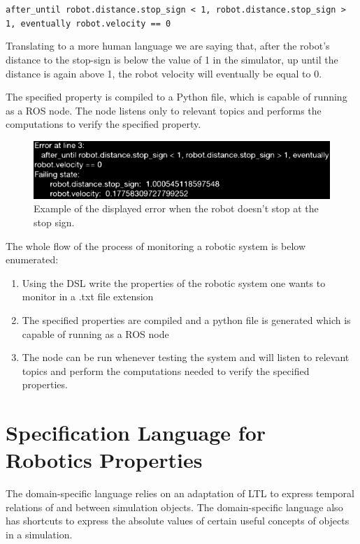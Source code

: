 \documentclass[runningheads]{llncs}
\begin{document}
\vspace{3mm}

\texttt{after\_until robot.distance.stop\_sign < 1, robot.distance.stop\_sign > 1, eventually robot.velocity == 0}

\vspace{3mm}

Translating to a more human language we are saying that, after the robot's distance to the stop-sign is below the value of 1 in the simulator, up until the distance is again above 1, the robot velocity will eventually be equal to 0.

The specified property is compiled to a Python file, which is capable of running as a ROS node. The node listens only to relevant topics and performs the computations to verify the specified property.

\begin{figure}
\includegraphics[width=\textwidth]{error.eps}
\caption{Example of the displayed error when the robot doesn't stop at the stop sign.} \label{fig1}
\end{figure}

The whole flow of the process of monitoring a robotic system is below enumerated:

\begin{enumerate}[label=(\roman*)]
    \item Using the DSL write the properties of the robotic system one wants to monitor in a .txt file extension
    \item The specified properties are compiled and a python file is generated which is capable of running as a ROS node
    \item The node can be run whenever testing the system and will listen to relevant topics and perform the computations needed to verify the specified properties.
\end{enumerate}


\section{Specification Language for Robotics Properties}

The domain-specific language relies on an adaptation of LTL to express temporal relations of and between simulation objects. The domain-specific language also has shortcuts to express the absolute values of certain useful concepts of objects in a simulation.
\end{document}
